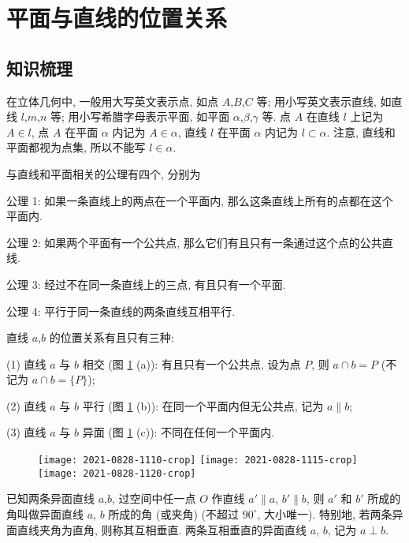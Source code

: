 
\section{平面与直线的位置关系}

\subsection{知识梳理}
在立体几何中, 一般用大写英文表示点, 如点 $A$,$B$,$C$ 等; 用小写英文表示直线, 如直线 $l$,$m$,$n$ 等; 用小写希腊字母表示平面, 如平面 $\alpha$,$\beta$,$\gamma$ 等. 点 $A$ 在直线 $l$ 上记为 $A\in l$, 点 $A$ 在平面 $\alpha$ 内记为 $A\in \alpha$, 直线 $l$ 在平面 $\alpha$ 内记为 $l\subset \alpha$. 注意, 直线和平面都视为点集, 所以不能写 $l\in\alpha$.

与直线和平面相关的公理有四个, 分别为

公理 1: 如果一条直线上的两点在一个平面内, 那么这条直线上所有的点都在这个平面内.

公理 2: 如果两个平面有一个公共点, 那么它们有且只有一条通过这个点的公共直线.

公理 3: 经过不在同一条直线上的三点, 有且只有一个平面.

公理 4: 平行于同一条直线的两条直线互相平行.


直线 $a$,$b$ 的位置关系有且只有三种:

(1) 直线 $a$ 与 $b$ 相交 (图 \ref{fig:2021-0828-1110} (a)): 有且只有一个公共点, 设为点 $P$, 则 $a\cap b= P$ (不记为 $a\cap b= \{P\}$);

(2) 直线 $a$ 与 $b$ 平行 (图 \ref{fig:2021-0828-1110} (b)): 在同一个平面内但无公共点, 记为 $a\parallel b$;

(3) 直线 $a$ 与 $b$ 异面 (图 \ref{fig:2021-0828-1110} (c)): 不同在任何一个平面内.

\begin{figure}[htb]
    \small\centering
    \texttt{[image: 2021-0828-1110-crop]}\qquad
    \texttt{[image: 2021-0828-1115-crop]}\qquad
    \texttt{[image: 2021-0828-1120-crop]}
    \caption{}\label{fig:2021-0828-1110}
\end{figure}

已知两条异面直线 $a$,$b$, 过空间中任一点 $O$ 作直线 $a'\parallel a$, $b'\parallel b$, 则 $a'$ 和 $b'$ 所成的角叫做异面直线 $a$, $b$ 所成的角 (或夹角) (不超过 $90^\circ$, 大小唯一). 特别地, 若两条异面直线夹角为直角, 则称其互相垂直. 两条互相垂直的异面直线 $a$, $b$, 记为 $a\perp b$.

